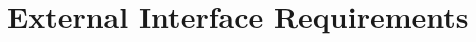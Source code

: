 \documentclass[11pt]{article}
\begin{document}
\section{External Interface Requirements}
\end{document}
